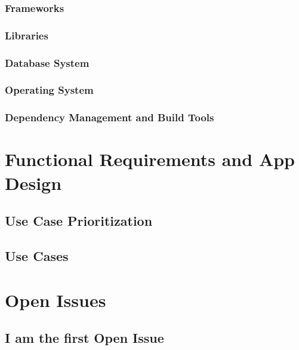 \documentclass[11pt,fleqn]{book} %
\begin{document}
		\subsection{Frameworks}
		\subsection{Libraries}
		\subsection{Database System}
		\subsection{Operating System}
		\subsection{Dependency Management and Build Tools}



\chapter{Functional Requirements and App Design}

	\section{Use Case Prioritization}
	\section{Use Cases}
	
	


\chapter{Open Issues}

\section{I am the first Open Issue}
\end{document}
